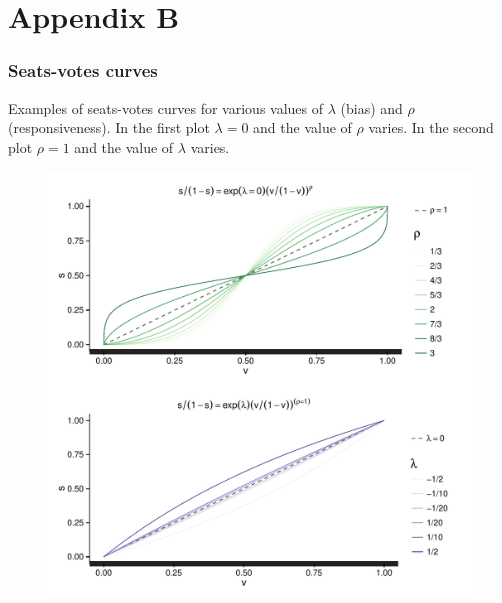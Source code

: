 \chapter*{Appendix B}\label{AppendixB}
\vspace{-1.75cm}
\subsection{Seats-votes curves}

Examples of seats-votes curves for various values of $\lambda$ (bias) and $\rho$ (responsiveness). 
In the first plot $\lambda =0 $ and the value of $\rho$ varies. In the second plot 
$\rho = 1$ and the value of $\lambda$ varies. 

\begin{figure}[h]
\centering
	\includegraphics[scale=0.8]{sections/figs/seats_votes}
\label{fig:seats_votes}
\end{figure}


